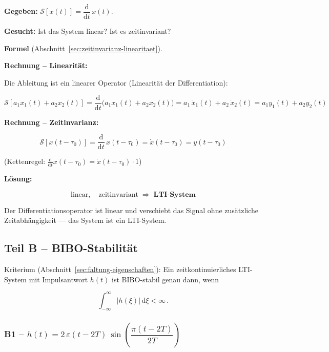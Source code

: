 \begin{beispiel}[Linearität und Zeitinvarianz: $y(t) = \dot{x}(t)$]

\textbf{Gegeben:} $\mathcal{S}[x(t)] = \dfrac{\mathrm{d}}{\mathrm{d}t}\,x(t)$.

\textbf{Gesucht:} Ist das System linear? Ist es zeitinvariant?

\textbf{Formel} (Abschnitt~\ref{sec:zeitinvarianz-linearitaet}).

\textbf{Rechnung – Linearität:}

Die Ableitung ist ein linearer Operator (Linearität der Differentiation):

$$
\mathcal{S}[a_1 x_1(t) + a_2 x_2(t)]
= \frac{\mathrm{d}}{\mathrm{d}t}\bigl(a_1 x_1(t) + a_2 x_2(t)\bigr)
= a_1\,\dot{x}_1(t) + a_2\,\dot{x}_2(t)
= a_1 y_1(t) + a_2 y_2(t)
$$

\textbf{Rechnung – Zeitinvarianz:}

$$
\mathcal{S}[x(t-\tau_0)]
= \frac{\mathrm{d}}{\mathrm{d}t}\,x(t-\tau_0)
= \dot{x}(t-\tau_0)
= y(t-\tau_0)
$$

(Kettenregel: $\frac{\mathrm{d}}{\mathrm{d}t}x(t-\tau_0) = \dot{x}(t-\tau_0)\cdot 1$)

\textbf{Lösung:}

$$
\boxed{\text{linear},\quad \text{zeitinvariant} \;\Rightarrow\; \textbf{LTI-System}}
$$

Der Differentiationsoperator ist linear und verschiebt das Signal ohne
zusätzliche Zeitabhängigkeit — das System ist ein LTI-System.

\end{beispiel}

\subsection*{Teil B – BIBO-Stabilität}

Kriterium (Abschnitt~\ref{sec:faltung-eigenschaften}): Ein zeitkontinuierliches LTI-System
mit Impulsantwort $h(t)$ ist BIBO-stabil genau dann, wenn

$$
\int_{-\infty}^{\infty} |h(\xi)|\,\mathrm{d}\xi < \infty\,.
$$

\subsubsection*{B1 – $h(t) = 2\,\varepsilon(t-2T)\,\sin\!\left(\dfrac{\pi(t-2T)}{2T}\right)$}

